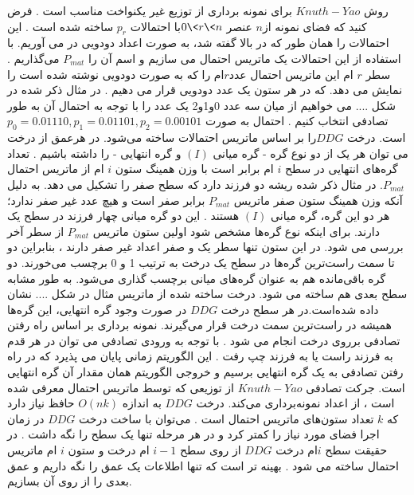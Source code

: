 روش $Knuth-Yao$ برای نمونه برداری از توزیع غیر یکنواخت مناسب است . فرض کنید که فضای نمونه از$ n$  عنصر $0\< r \< n$با احتمالات  $p_{r}$ ساخته شده است . این احتمالات را همان طور که در بالا گفته شد، به صورت اعداد دودویی در می آوریم.   با استفاده از این احتمالات یک ماتریس احتمال می سازیم و اسم آن را $P_{mat}$  می‌گذاریم . سطر $ r$ ام این ماتریس احتمال عدد$ r $ام را که به صورت دودویی نوشته شده است را  نمایش می دهد. که در هر ستون یک عدد دودویی قرار می دهیم .  در مثال ذکر شده در شکل .... می خواهیم از میان سه عدد 0و1و2  یک عدد را با توجه به احتمال آن به طور تصادفی انتخاب کنیم . احتمال به صورت $p_{0}= 0.01110, p_{1} = 0.01101, p_{2} = 0.00101$ است. 
درخت $DDG $را  بر اساس ماتریس احتمالات ساخته می‌شود. در هرعمق از درخت می توان  هر یک از دو نوع گره - گره میانی $(I)$ و گره انتهایی - را داشته باشیم . تعداد گره‌های انتهایی در سطح $i$ ام برابر است با وزن همینگ ستون $i$ ام از ماتریس احتمال $P_{mat}$.  در مثال ذکر شده ریشه دو فرزند دارد که سطح صفر را تشکیل می دهد. به دلیل آنکه وزن همینگ ستون صفر ماتریس $P_{mat}$ برابر صفر است و هیچ عدد غیر صفر ندارد؛ هر دو این گره، گره میانی    $(I)$  هستند . این دو گره میانی چهار فرزند در سطح یک دارند. برای اینکه نوع گره‌ها مشخص شود اولین ستون ماتریس $P_{mat}$ از سطر آخر بررسی می شود. در این ستون تنها سطر یک و صفر اعداد غیر صفر دارند ، بنابراین  دو تا سمت راست‌ترین گره‌ها در سطح یک درخت به ترتیب  1 و 0 برچسب می‌خورند. دو گره باقی‌مانده هم به عنوان گره‌های میانی برچسب گذاری می‌شود. به طور مشابه سطح بعدی هم ساخته می شود. درخت ساخته شده از ماتریس مثال در شکل .... نشان داده شده‌است.در هر سطح درخت $DDG$ در صورت وجود گره انتهایی، این گره‌ها همیشه در راست‌ترین سمت درخت قرار می‌گیرند.
 نمونه برداری بر اساس راه رفتن تصادفی برروی درخت انجام می شود . با توجه به ورودی تصادفی  می توان در هر قدم به فرزند راست یا به فرزند چپ رفت . این الگوریتم زمانی پایان می پذیرد که در راه رفتن تصادفی به یک گره انتهایی برسیم و خروجی الگوریتم همان مقدار آن گره انتهایی است. جرکت تصادفی $Knuth-Yao$ از توزیعی که توسط ماتریس احتمال معرفی شده است ، از اعداد نمونه‌برداری می‌کند.
درخت $DDG$ به اندازه $O(nk)$ حافظ  نیاز دارد که $k $ تعداد ستون‌های ماتریس احتمال است . می‌توان با ساخت درخت $DDG$ در زمان اجرا فضای مورد نیاز را کمتر کرد و در هر مرحله تنها یک سطح را نگه داشت . در حقیقت سطح $i $ام   درخت $DDG$ از روی سطح $i-1$   ام درخت و ستون $i$ ام ماتریس احتمال ساخته می شود . بهینه تر است که تنها اطلاعات یک عمق را نگه داریم و عمق بعدی را از روی آن بسازیم. 



